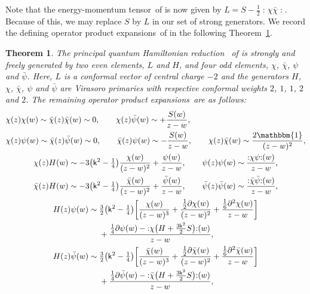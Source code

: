 \documentclass[pdftex]{sigma}
\numberwithin{equation}{section}
\newcommand{\pd}{\partial} %
\newcommand{\wun}{\mathbbm{1}} %
\newcommand{\bchi}{\bar{\chi}{}} %
\newcommand{\bpsi}{\bar{\psi}{}} %
\newcommand{\kk}{\mathsf{k}} %
\DeclarePairedDelimiter{\brac}{\lparen}{\rparen} %
\DeclarePairedDelimiter{\sqbrac}{\lbrack}{\rbrack} %
\newcommand{\no}[1]{\mathopen{:} #1 \mathclose{:}} %
\newcommand{\alg}[1]{\mathfrak{#1}} %
\newcommand{\VOA}[1]{\mathsf{#1}} %
\newcommand{\SLSA}[3]{\alg{#1}_{#2 \vert #3}} %
\newcommand{\psl}{\SLSA{psl}{2}{2}}
\newcommand{\uaff}[2]{\VOA{V}^{#1}(#2)} %
\newcommand{\upsl}[1][\kk]{\uaff{#1}{\psl}} %
\newcommand{\uwalg}[2]{\VOA{W}^{#1}_{\mathrm{#2}}} %
\newcommand{\upr}[1][\kk]{\uwalg{#1}{pr}} %
\newcommand{\emt}{energy-momentum tensor}
\newcommand{\ope}{operator product expansion}
\newcommand{\opes}{\ope s}
\newcommand{\qhr}{quantum Hamiltonian reduction} %
\newtheorem{Theorem}{Theorem}[section]
\begin{document}
Note that the \emt\ of \smash{$\upr$} is now given by
$L = S - \frac{1}{2} \no{\chi\bchi}$.
Because of this, we may replace $S$ by $L$ in our set of strong generators.
We record the defining \opes\ of \smash{$\upr$} in the following Theorem~\ref{thm:propes}.
%
\begin{Theorem} \label{thm:propes}
	The principal \qhr\ \smash{$\upr$} of \smash{$\upsl$} is strongly and freely generated by two even elements, $L$ and $H$, and four odd elements, $\chi$, $\bchi$, $\psi$ and $\bpsi$.
	Here, $L$ is a conformal vector of central charge $-2$ and the generators $H$, $\chi$, $\bchi$, $\psi$ and $\bpsi$ are Virasoro primaries with respective conformal weights $2$, $1$, $1$, $2$ and $2$.
	The remaining \opes\ are as follows:
	\begin{subequations} \label{eq:opes}
		\begin{gather}
			\begin{aligned}
				&\chi(z) \chi(w) \sim \bchi(z) \bchi(w) \sim 0, \qquad
				\chi(z) \bpsi(w) \sim +\frac{S(w)}{z-w},
				\\
				&\chi(z) \psi(w) \sim \bchi(z) \bpsi(w) \sim 0, \qquad
				\bchi(z) \psi(w) \sim -\frac{S(w)}{z-w},\qquad
 \chi(z) \bchi(w) \sim \frac{2\wun}{(z-w)^2},
			\end{aligned}
			\\
			\begin{aligned}
				&\chi(z) H(w) \sim -3\brac*{\kk^2-\tfrac{1}{4}} \frac{\chi(w)}{(z-w)^2} + \frac{\psi(w)}{z-w}, \qquad
				\psi(z) \psi(w) \sim \frac{\no{\chi\psi}(w)}{z-w}, \\
				& \bchi(z) H(w) \sim -3\brac*{\kk^2-\tfrac{1}{4}} \frac{\bchi(w)}{(z-w)^2} + \frac{\bpsi(w)}{z-w}, \qquad
				 \bpsi(z) \bpsi(w) \sim \frac{\no{\bchi\bpsi}(w)}{z-w},
			\end{aligned}
			\\
			\begin{aligned}
				H(z) \psi(w) \sim{}& \tfrac{3}{2}\brac*{\kk^2-\tfrac{1}{4}} \sqbrac*{\frac{\chi(w)}{(z-w)^3} + \frac{\frac{1}{2}\pd\chi(w)}{(z-w)^2} + \frac{\frac{1}{6}\pd^2\chi(w)}{z-w}} \\
&+ \frac{\frac{1}{4}\pd\psi(w) - \no{\chi\big(H+\frac{3\kk^2}{2}S\big)}(w)}{z-w}, \\
				H(z) \bpsi(w) \sim{}& \tfrac{3}{2}\brac*{\kk^2-\tfrac{1}{4}} \sqbrac*{\frac{\bchi(w)}{(z-w)^3} + \frac{\frac{1}{2}\pd\bchi(w)}{(z-w)^2} + \frac{\frac{1}{6}\pd^2\bchi(w)}{z-w}}\\
& + \frac{\frac{1}{4}\pd\bpsi(w) - \no{\bchi\big(H+\frac{3\kk^2}{2}S\big)}(w)}{z-w},

\end{aligned}
\end{gather}
\end{subequations}
\end{Theorem}
\end{document}
